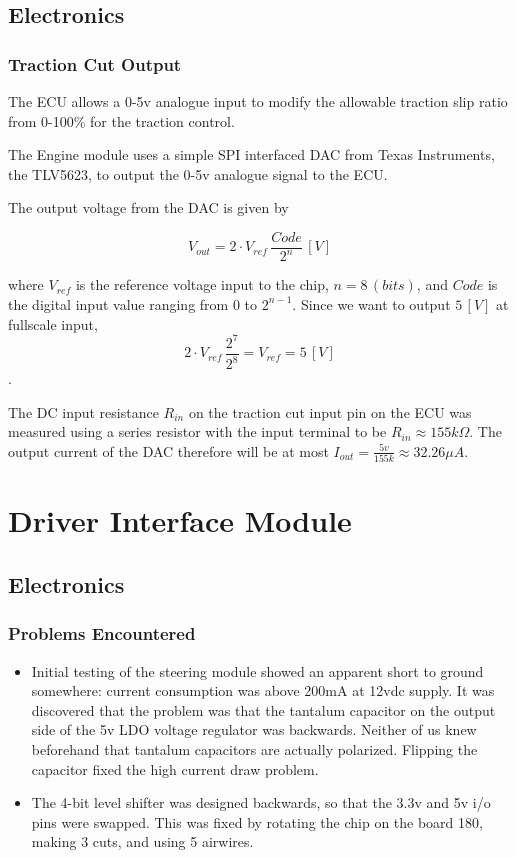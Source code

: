 \section{Electronics}


\subsection{Traction Cut Output}

The ECU allows a 0-5v analogue input to modify the allowable traction
slip ratio from 0-100\% for the traction control.

The Engine module uses a simple SPI interfaced DAC from Texas Instruments,
the TLV5623, to output the 0-5v analogue signal to the ECU.

The output voltage from the DAC is given by

\begin{equation}
V_{out}=2\cdot{V_{ref}}\,\frac{Code}{2^{n}}\,[V]\end{equation}


where $V_{ref}$ is the reference voltage input to the chip, $n=8\,(bits)$,
and $Code$ is the digital input value ranging from $0$ to $2^{n-1}$.
Since we want to output $5\,[V]$ at fullscale input, \begin{equation}
2\cdot{V_{ref}}\,\frac{2^{7}}{2^{8}}=V_{ref}=5\,[V]\end{equation}
.

The DC input resistance $R_{in}$ on the traction cut input pin on
the ECU was measured using a series resistor with the input terminal
to be $R_{in}\approx155k\Omega$. The output current of the DAC therefore
will be at most $I_{out}=\frac{5v}{155k}\approx32.26\mu A$.

\chapter{Driver Interface Module}

\label{chap:driver}


\section{Electronics}


\subsection{Problems Encountered}
\begin{itemize}
\item Initial testing of the steering module showed an apparent short to
ground somewhere: current consumption was above 200mA at 12vdc supply.
It was discovered that the problem was that the tantalum capacitor
on the output side of the 5v LDO voltage regulator was backwards.
Neither of us knew beforehand that tantalum capacitors are actually
polarized. Flipping the capacitor fixed the high current draw problem.
\item The 4-bit level shifter was designed backwards, so that the 3.3v and
5v i/o pins were swapped. This was fixed by rotating the chip on the
board 180\textdegree{}, making 3 cuts, and using 5 airwires. 
\end{itemize}

